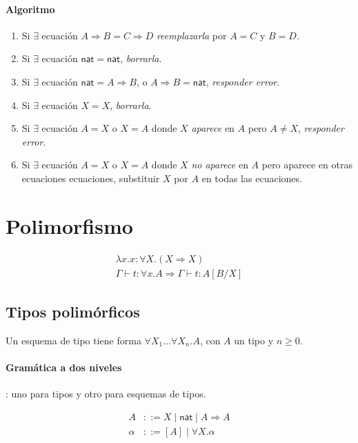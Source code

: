 \documentclass[twoside,a4paper,12pt]{article}
\theoremstyle{definition}
\theoremstyle{remark}
\newcommand\fun[2]{\ensuremath{\lambda {#1}{.}{#2}}}
\newcommand\nat{\ensuremath{\mathsf{nat}}}
\begin{document}
\paragraph{Algoritmo}
\begin{enumerate}
  \item Si $\exists$ ecuación $A\Rightarrow B=C\Rightarrow D$ \emph{reemplazarla}
    por $A=C$ y $B=D$.
  \item Si $\exists$ ecuación $\nat=\nat$, \emph{borrarla}.
  \item Si $\exists$ ecuación $\nat=A\Rightarrow B$, o $A\Rightarrow B=\nat$, \emph{responder error}.
  \item Si $\exists$ ecuación $X=X$, \emph{borrarla}.
  \item Si $\exists$ ecuación $A=X$ o $X=A$ donde $X$ \emph{aparece} en $A$ pero $A\neq X$, \emph{responder error}.
  \item Si $\exists$ ecuación $A=X$ o $X=A$ donde $X$ \emph{no aparece} en $A$ pero
    aparece en otras ecuaciones ecuaciones, substituir $X$ por $A$ en todas las
    ecuaciones.
\end{enumerate}


\newpage
\section*{Polimorfismo}

\begin{gather*}
  \fun xx : \forall X.(X\Rightarrow X) \\
  \Gamma \vdash t : \forall x.A \Rightarrow \Gamma \vdash t: A[B/X]
\end{gather*}

\subsection*{Tipos polimórficos}

\begin{definicion}{6.2}
  Un esquema de tipo tiene forma $\forall X_1\dots\forall X_n.A$,
  con $A$ un tipo y $n\geq 0$.
\end{definicion}

\paragraph*{Gramática a dos niveles}: uno para tipos y otro para
esquemas de tipos.

\begin{align*}
  A & ::= X \mid \nat \mid A\Rightarrow A\\
  \alpha & ::= [A]\mid\forall X.\alpha
\end{align*}
\end{document}
